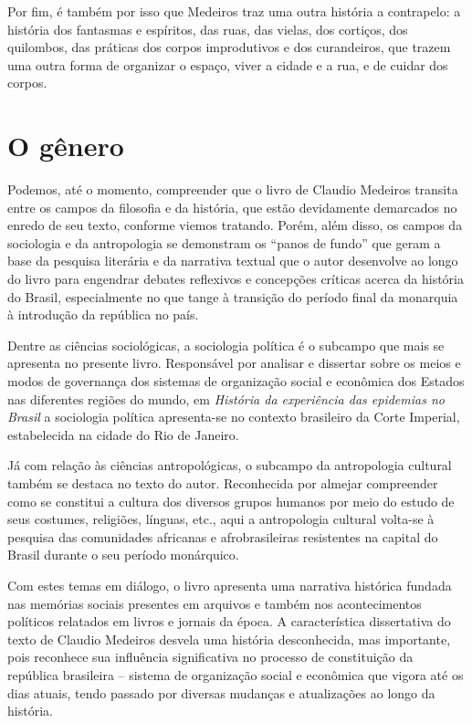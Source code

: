 Por fim, é também por isso que Medeiros traz uma outra história a
contrapelo: a história dos fantasmas e espíritos, das ruas, das vielas,
dos cortiços, dos quilombos, das práticas dos corpos improdutivos e dos
curandeiros, que trazem uma outra forma de organizar o espaço, viver a
cidade e a rua, e de cuidar dos corpos.

\hypertarget{o-guxeanero}{%
\section{O gênero}\label{o-guxeanero}}

Podemos, até o momento, compreender que o livro de Claudio Medeiros
transita entre os campos da filosofia e da história, que estão
devidamente demarcados no enredo de seu texto, conforme viemos tratando.
Porém, além disso, os campos da sociologia e da antropologia se
demonstram os ``panos de fundo'' que geram a base da pesquisa literária
e da narrativa textual que o autor desenvolve ao longo do livro para
engendrar debates reflexivos e concepções críticas acerca da história do
Brasil, especialmente no que tange à transição do período final da
monarquia à introdução da república no país.

Dentre as ciências sociológicas, a sociologia política é o subcampo que
mais se apresenta no presente livro. Responsável por analisar e
dissertar sobre os meios e modos de governança dos sistemas de
organização social e econômica dos Estados nas diferentes regiões do
mundo, em \emph{História da experiência das epidemias no Brasil} a
sociologia política apresenta-se no contexto brasileiro da Corte
Imperial, estabelecida na cidade do Rio de Janeiro.

Já com relação às ciências antropológicas, o subcampo da antropologia
cultural também se destaca no texto do autor. Reconhecida por almejar
compreender como se constitui a cultura dos diversos grupos humanos por
meio do estudo de seus costumes, religiões, línguas, etc., aqui a
antropologia cultural volta-se à pesquisa das comunidades africanas e
afrobrasileiras resistentes na capital do Brasil durante o seu período
monárquico.

Com estes temas em diálogo, o livro apresenta uma narrativa histórica
fundada nas memórias sociais presentes em arquivos e também nos
acontecimentos políticos relatados em livros e jornais da época. A
característica dissertativa do texto de Claudio Medeiros desvela uma
história desconhecida, mas importante, pois reconhece sua influência
significativa no processo de constituição da república brasileira --
sistema de organização social e econômica que vigora até os dias atuais,
tendo passado por diversas mudanças e atualizações ao longo da história.

